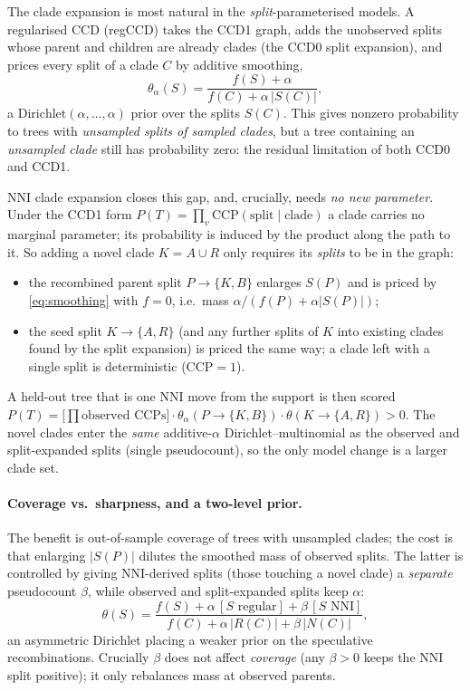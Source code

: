 \documentclass{article}
\begin{document}
The clade expansion is most natural in the \emph{split}-parameterised models.
A regularised CCD (regCCD) takes the CCD1 graph, adds the unobserved splits whose
parent and children are already clades (the CCD0 split expansion), and prices
every split of a clade $C$ by additive smoothing,
\begin{equation}
  \theta_\alpha(S)=\frac{f(S)+\alpha}{f(C)+\alpha\,|S(C)|},
  \label{eq:smoothing}
\end{equation}
a $\mathrm{Dirichlet}(\alpha,\dots,\alpha)$ prior over the splits $S(C)$. This
gives nonzero probability to trees with \emph{unsampled splits of sampled
clades}, but a tree containing an \emph{unsampled clade} still has probability
zero: the residual limitation of both CCD0 and CCD1.

NNI clade expansion closes this gap, and, crucially, needs \emph{no new
parameter}. Under the CCD1 form $P(T)=\prod_v \mathrm{CCP}\!\left(\text{split}\mid
\text{clade}\right)$ a clade carries no marginal parameter; its probability is
induced by the product along the path to it. So adding a novel clade $K=A\cup R$
only requires its \emph{splits} to be in the graph:
\begin{itemize}
  \item the recombined parent split $P\to\{K,B\}$ enlarges $S(P)$ and is priced
    by \eqref{eq:smoothing} with $f=0$, i.e.\ mass $\alpha/(f(P)+\alpha|S(P)|)$;
  \item the seed split $K\to\{A,R\}$ (and any further splits of $K$ into existing
    clades found by the split expansion) is priced the same way; a clade left
    with a single split is deterministic ($\mathrm{CCP}=1$).
\end{itemize}
A held-out tree that is one NNI move from the support is then scored
$P(T)=\bigl[\prod\text{observed CCPs}\bigr]\cdot\theta_\alpha(P\to\{K,B\})\cdot
\theta(K\to\{A,R\})>0$. The novel clades enter the \emph{same} additive-$\alpha$
Dirichlet--multinomial as the observed and split-expanded splits (single
pseudocount), so the only model change is a larger clade set.

\paragraph{Coverage vs.\ sharpness, and a two-level prior.}
The benefit is out-of-sample coverage of trees with unsampled clades; the cost is
that enlarging $|S(P)|$ dilutes the smoothed mass of observed splits. The latter
is controlled by giving NNI-derived splits (those touching a novel clade) a
\emph{separate} pseudocount $\beta$, while observed and split-expanded splits keep
$\alpha$:
\begin{equation}
  \theta(S)=\frac{f(S)+\alpha\,[S\text{ regular}]+\beta\,[S\text{ NNI}]}
                 {f(C)+\alpha\,|R(C)|+\beta\,|N(C)|},
  \label{eq:twolevel}
\end{equation}
an asymmetric Dirichlet placing a weaker prior on the speculative
recombinations. Crucially $\beta$ does not affect \emph{coverage} (any
$\beta>0$ keeps the NNI split positive); it only rebalances mass at observed
parents.
\end{document}
